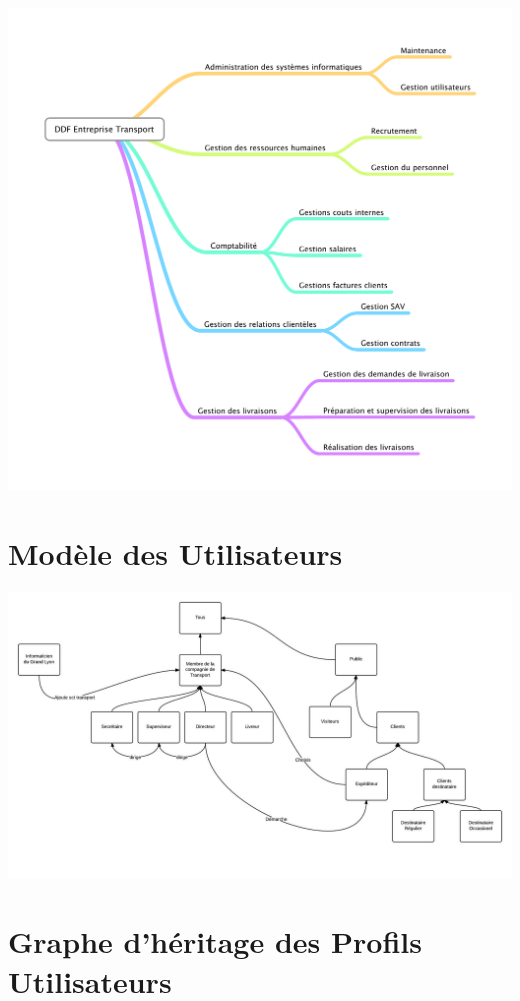 \documentclass{report}
\begin{document}
\paragraph{}

\includegraphics[scale = 0.4]{images/DDF.pdf}


\section{Modèle des Utilisateurs}

\includegraphics[scale = 0.3, angle=90]{images/MU.jpeg}


\section{Graphe d'héritage des Profils Utilisateurs}
\end{document}
